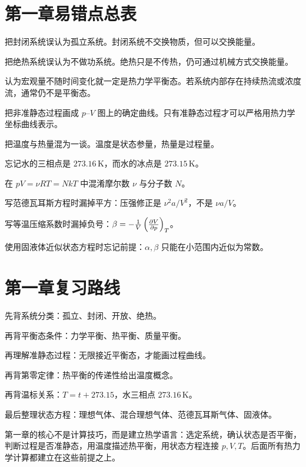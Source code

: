 \section{第一章易错点总表}

\begin{WarnBox}[本章高频错误]
\begin{PitfallList}
  \item 把封闭系统误认为孤立系统。封闭系统不交换物质，但可以交换能量。
  \item 把绝热系统误认为不做功系统。绝热只是不传热，仍可通过机械方式交换能量。
  \item 认为宏观量不随时间变化就一定是热力学平衡态。若系统内部存在持续热流或浓度流，通常仍不是平衡态。
  \item 把非准静态过程画成 \(p\)--\(V\) 图上的确定曲线。只有准静态过程才可以严格用热力学坐标曲线表示。
  \item 把温度与热量混为一谈。温度是状态参量，热量是过程量。
  \item 忘记水的三相点是 \(273.16\,\mathrm K\)，而水的冰点是 \(273.15\,\mathrm K\)。
  \item 在 \(pV=\nu RT=NkT\) 中混淆摩尔数 \(\nu\) 与分子数 \(N\)。
  \item 写范德瓦耳斯方程时漏掉平方：压强修正是 \(\nu^2a/V^2\)，不是 \(\nu a/V\)。
  \item 写等温压缩系数时漏掉负号：\(\beta=-\frac{1}{V}\left(\frac{\partial V}{\partial p}\right)_{T}\)。
  \item 使用固液体近似状态方程时忘记前提：\(\alpha,\beta\) 只能在小范围内近似为常数。
\end{PitfallList}
\end{WarnBox}

\section{第一章复习路线}

\begin{MethodBox}[建议背诵顺序]
\begin{ReviewList}
  \item 先背系统分类：孤立、封闭、开放、绝热。
  \item 再背平衡态条件：力学平衡、热平衡、质量平衡。
  \item 再理解准静态过程：无限接近平衡态，才能画过程曲线。
  \item 再背第零定律：热平衡的传递性给出温度概念。
  \item 再背温标关系：\(T=t+273.15\)，水三相点 \(273.16\,\mathrm K\)。
  \item 最后整理状态方程：理想气体、混合理想气体、范德瓦耳斯气体、固液体。
\end{ReviewList}
\end{MethodBox}

\begin{KeyBox}[第一章一句话总结]
第一章的核心不是计算技巧，而是建立热学语言：选定系统，确认状态是否平衡，判断过程是否准静态，用温度描述热平衡，用状态方程连接 \(p,V,T\)。后面所有热力学计算都建立在这些前提之上。
\end{KeyBox}